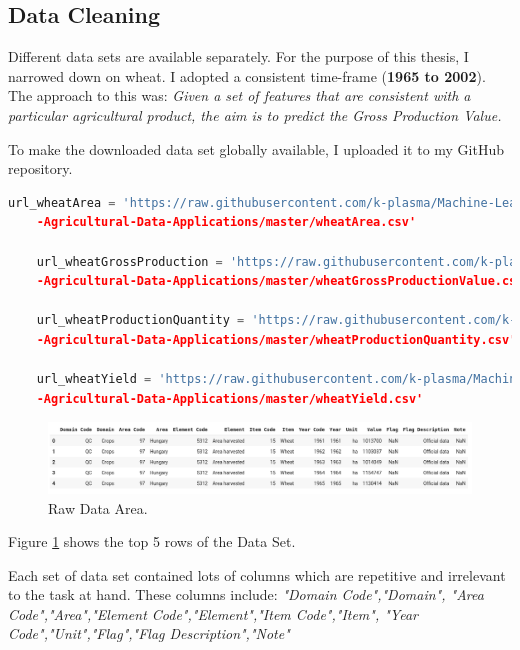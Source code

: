  




\subsection{Data Cleaning} 

Different data sets are available separately. For the purpose of this thesis, I narrowed down on wheat. I adopted a consistent time-frame (\textbf{1965 to 2002}). The approach to this was: \textit{Given a set of features that are consistent with a particular agricultural product, the aim is to predict the Gross Production Value.}

To make the downloaded data set globally available, I uploaded it to my GitHub repository.\cite{adeyemo_2020}

\begin{lstlisting}[language=Python]
	url_wheatArea = 'https://raw.githubusercontent.com/k-plasma/Machine-Learning-Models-for
	-Agricultural-Data-Applications/master/wheatArea.csv'	
	
	url_wheatGrossProduction = 'https://raw.githubusercontent.com/k-plasma/Machine-Learning-Models-for
	-Agricultural-Data-Applications/master/wheatGrossProductionValue.csv'	
	
	url_wheatProductionQuantity = 'https://raw.githubusercontent.com/k-plasma/Machine-Learning-Models-for
	-Agricultural-Data-Applications/master/wheatProductionQuantity.csv'	
	
	url_wheatYield = 'https://raw.githubusercontent.com/k-plasma/Machine-Learning-Models-for
	-Agricultural-Data-Applications/master/wheatYield.csv'
\end{lstlisting}

\begin{figure}[h!]
	\includegraphics[width=\textwidth,height=\textheight,keepaspectratio]{fig/Area_Head.png}
	\caption{Raw Data Area.}
	\label{fig:Areaa_Head1}
\end{figure}

Figure \ref{fig:Areaa_Head1} shows the top 5 rows of the Data Set.


Each set of data set contained lots of columns which are repetitive and irrelevant to the task at hand. These columns include: \textit{"Domain Code","Domain",
	"Area Code","Area","Element Code","Element","Item Code","Item",
	"Year Code","Unit","Flag","Flag Description","Note"}


